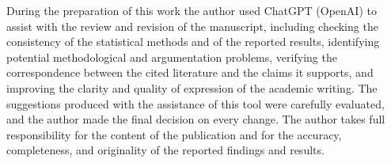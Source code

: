 \documentclass[preprint,12pt]{elsarticle}
\begin{document}
During the preparation of this work the author used ChatGPT (OpenAI) to
assist with the review and revision of the manuscript, including checking the
consistency of the statistical methods and of the reported results,
identifying potential methodological and argumentation problems, verifying
the correspondence between the cited literature and the claims it supports,
and improving the clarity and quality of expression of the academic writing.
The suggestions produced with the assistance of this tool were carefully
evaluated, and the author made the final decision on every change. The author
takes full responsibility for the content of the publication and for the
accuracy, completeness, and originality of the reported findings and results.



\end{document}
